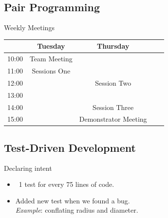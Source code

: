\documentclass[]{beamer}
\begin{document}
\subsection{Pair Programming}
\begin{frame}{Weekly Meetings}
  \begin{block}{}
    \begin{tabular}{|r|c|c|c|c|} \hline
      & Tuesday      & Thursday                   \\ \hline
      10:00 & Team Meeting &                      \\ \hline
      11:00 & Sessions One &                      \\ \hline
      12:00 &              & Session Two          \\ \hline
      13:00 &              &                      \\ \hline
      14:00 &              & Session Three        \\ \hline
      15:00 &              & Demonstrator Meeting \\ \hline
    \end{tabular}
  \end{block}
\end{frame}


\subsection{Test-Driven Development}
\begin{frame}{Declaring intent}
  \begin{itemize}
  \item ~1 test for every 75 lines of code.
  \item Added new test when we found a bug.\\
    \emph{Example}: conflating radius and diameter.
  \end{itemize}
\end{frame}
\end{document}
